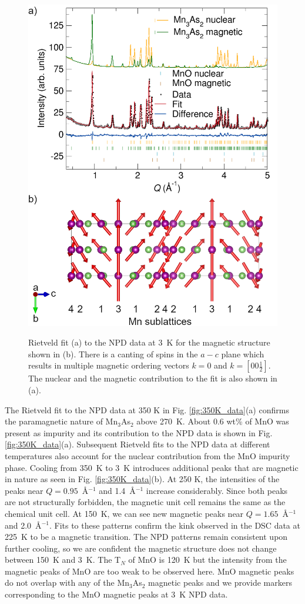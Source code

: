\documentclass[letterpaper,10pt,doublespacing,edeposit]{uiucthesis2020}
\begin{document}
\begin{mainmatter}
\begin{figure}
\centering\includegraphics[width=0.75\columnwidth]{figures/ch6/3K_mag_structure.png} \\
\caption{Rietveld fit (a) to the NPD data at 3~K for the magnetic structure shown in (b). There is a canting of spins in the $a-c$ plane which results in multiple magnetic ordering vectors $k = 0$ and $k = [00\frac{1}{2}]$. The nuclear and the magnetic contribution to the fit is also shown in (a). 
}
\label{fig:3K_data}
\end{figure}


The Rietveld fit to the NPD data at 350 K in Fig. \ref{fig:350K_data}(a) confirms the paramagnetic nature of Mn$_3$As$_2$ above 270~K. About 0.6 wt\% of MnO was present as impurity and its contribution to the NPD data is shown in Fig. \ref{fig:350K_data}(a). Subsequent Rietveld fits to the NPD data at different temperatures also account for the nuclear contribution from the MnO impurity phase. Cooling from 350~K to 3~K introduces additional peaks that are magnetic in nature as seen in Fig. \ref{fig:350K_data}(b).
At 250 K, the intensities of the peaks near $Q = 0.95$~\AA$^{-1}$ and 1.4~\AA$^{-1}$ increase considerably. Since both peaks are not structurally forbidden, the magnetic unit cell remains the same as the chemical unit cell.
At 150~K, we can see new magnetic peaks near $Q = 1.65$~\AA$^{-1}$ and 2.0~\AA$^{-1}$. Fits to these patterns confirm the kink observed in the DSC data at 225~K to be a magnetic transition. The NPD patterns remain consistent upon further cooling, so we are confident the magnetic structure does not change between 150~K and 3~K. The T$_N$ of MnO is 120~K but the intensity from the magnetic peaks of MnO are too weak to be observed here. MnO magnetic peaks do not overlap with any of the Mn$_3$As$_2$ magnetic peaks and we provide markers corresponding to the MnO magnetic peaks at 3~K NPD data.




\end{mainmatter}
\end{document}
